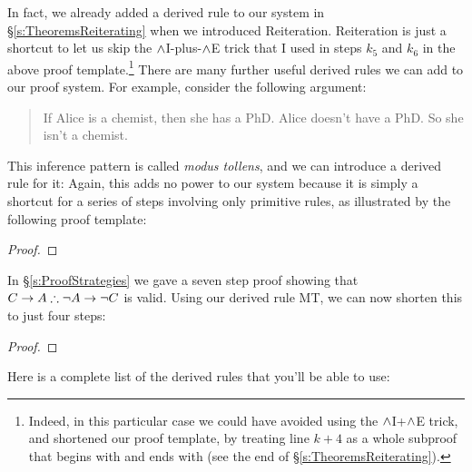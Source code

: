 In fact, we already added a derived rule to our system in \S\ref{s:TheoremsReiterating} when we introduced Reiteration.  Reiteration is just a shortcut to let us skip the $\wedge$I-plus-$\wedge$E trick that I used in steps $k_5$ and $k_6$ in the above proof template.\footnote{Indeed, in this particular case we could have avoided using the $\wedge$I+$\wedge$E trick, and shortened our proof template, by treating line $k+4$ as a whole subproof that begins with \meta{\psi} and ends with \meta{\psi} (see the end of \S\ref{s:TheoremsReiterating}).}  There are many further useful derived rules we can add to our proof system.  For example, consider the following argument:
	\begin{quote}
		If Alice is a chemist, then she has a PhD. Alice doesn't have a PhD. So she isn't a chemist.
	\end{quote}
This inference pattern is called \emph{modus tollens}, and we can introduce a derived rule for it:
Again, this adds no power to our system because it is simply a shortcut for a series of steps involving only primitive rules, as illustrated by the following proof template:
\begin{proof}
		\open
		\close
\end{proof}

In  \S\ref{s:ProofStrategies} we gave a seven step proof showing that $C \rightarrow A \therefore \neg A \rightarrow \neg C$ is valid.  Using our derived rule MT, we can now shorten this to just four steps:

\begin{proof}
  
\open
	 
	 
\close
{} 
\end{proof}
Here is a complete list of the derived rules that you'll be able to use:

